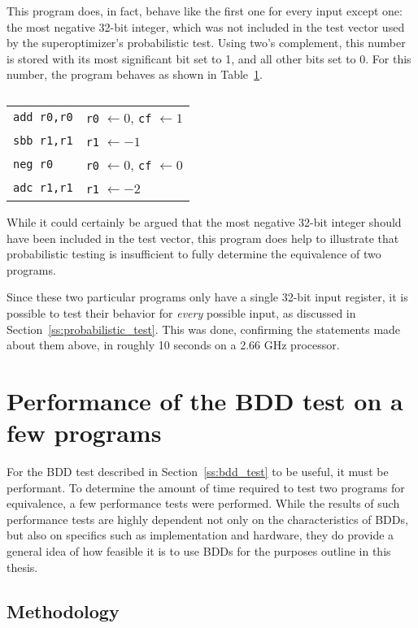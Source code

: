 \documentclass[a4paper,11pt]{kth-mag}
\renewcommand{\gets}{\leftarrow}
\begin{document}
This program does, in fact, behave like the first one for every input except one: the most negative 32-bit integer, which was not included in the test vector used by the superoptimizer's probabilistic test.
Using two's complement, this number is stored with its most significant bit set to 1, and all other bits set to 0.
For this number, the program behaves as shown in Table~\ref{tab:sign_incorrect}.

\begin{table}
\centering
\begin{tabular}{l|l}
\verb|add r0,r0|
& \verb|r0| $\gets 0$, \verb|cf| $\gets 1$ \\
\verb|sbb r1,r1|
& \verb|r1| $\gets -1$ \\
\verb|neg r0|
& \verb|r0| $\gets 0$, \verb|cf| $\gets 0$ \\
\verb|adc r1,r1|
& \verb|r1| $\gets -2$ \\
\end{tabular}
\caption{}
\label{tab:sign_incorrect}
\end{table}

While it could certainly be argued that the most negative 32-bit integer should have been included in the test vector, this program does help to illustrate that probabilistic testing is insufficient to fully determine the equivalence of two programs.

Since these two particular programs only have a single 32-bit input register, it is possible to test their behavior for \emph{every} possible input, as discussed in Section~\ref{ss:probabilistic_test}.
This was done, confirming the statements made about them above, in roughly 10 seconds on a 2.66 GHz processor.

\section{Performance of the BDD test on a few programs}
\label{s:performance_programs}

For the BDD test described in Section~\ref{ss:bdd_test} to be useful, it must be performant.
To determine the amount of time required to test two programs for equivalence, a few performance tests were performed.
While the results of such performance tests are highly dependent not only on the characteristics of BDDs, but also on specifics such as implementation and hardware, they do provide a general idea of how feasible it is to use BDDs for the purposes outline in this thesis.

\subsection{Methodology}
\end{document}
